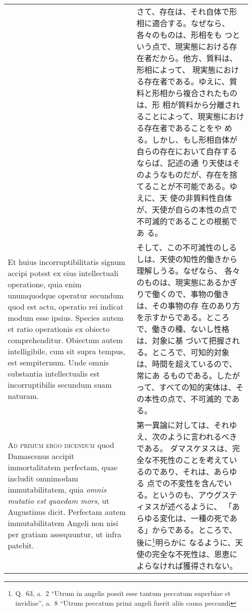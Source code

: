 \documentclass[10pt]{jsarticle} %
\begin{document}
\begin{longtable}{p{21em}p{21em}}
&

さて、存在は、それ自体で形相に適合する。なぜなら、各々のものは、形相をも
 つという点で、現実態における存在者だから。他方、質料は、形相によって、
 現実態における存在者である。ゆえに、質料と形相から複合されたものは、形
 相が質料から分離されることによって、現実態における存在者であることをや
 める。しかし、もし形相自体が自らの存在において自存するならば、記述の通
 り天使はそのようなものだが、存在を捨てることが不可能である。ゆえに、天
 使の非質料性自体が、天使が自らの本性の点で不可滅的であることの根拠であ
 る。

\\





Et huius incorruptibilitatis signum accipi potest
ex eius intellectuali operatione, quia enim unumquodque operatur
secundum quod est actu, operatio rei indicat modum esse ipsius. Species
autem et ratio operationis ex obiecto comprehenditur. Obiectum autem
intelligibile, cum sit supra tempus, est sempiternum. Unde omnis
substantia intellectualis est incorruptibilis secundum suam naturam.


&


そして、この不可滅性のしるしは、天使の知性的働きから理解しうる。なぜなら、
 各々のものは、現実態にあるかぎりで働くので、事物の働きは、その事物の存
 在のあり方を示すからである。ところで、働きの種、ないし性格は、対象に基
 づいて把握される。ところで、可知的対象は、時間を超えているので、常にあ
 るものである。したがって、すべての知的実体は、その本性の点で、不可滅的
 である。

\\


{\scshape Ad primum ergo dicendum} quod Damascenus accipit
immortalitatem perfectam, quae includit omnimodam immutabilitatem, quia
{\itshape omnis mutatio est quaedam mors}, ut Augustinus
dicit. Perfectam autem immutabilitatem Angeli non nisi per gratiam
assequuntur, ut infra patebit.

&

第一異論に対しては、それゆえ、次のように言われるべきである。
ダマスケヌスは、完全な不死性のことを考えているのであり、それは、あらゆる
 点での不変性を含んでいる。というのも、アウグスティヌスが述べるように、
 「あらゆる変化は、一種の死である」からである。ところで、後に\footnote{
Q.~63, a.~2 ``Utrum in angelis possit esse tantum peccatum superbiae et
 invidiae'', a.~8 ``Utrum peccatum primi angeli fuerit aliis causa peccandi
}明らかに
 なるように、天使の完全な不死性は、恩恵によらなければ獲得されない。


\end{longtable}
\end{document}
